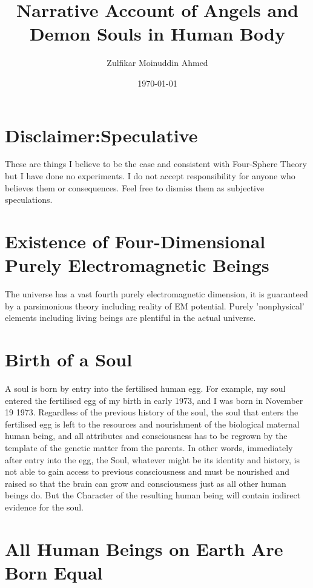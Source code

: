\documentclass{amsart}
\title{Narrative Account of Angels and Demon Souls in Human Body}
\author{Zulfikar Moinuddin Ahmed}
\date{\today}
\begin{document}
\maketitle

\section{Disclaimer:Speculative}

These are things I believe to be the case and consistent with Four-Sphere Theory but I have done no experiments.  I do not accept responsibility for anyone who believes them or consequences.  Feel free to dismiss them as subjective speculations.

\section{Existence of Four-Dimensional Purely Electromagnetic Beings}

The universe has a vast fourth purely electromagnetic dimension, it is guaranteed by a parsimonious theory including reality of EM potential.  Purely 'nonphysical' elements including living beings are plentiful in the actual universe.  

\section{Birth of  a Soul}

A soul is born by entry into the fertilised human egg.  For example, my soul entered the fertilised egg of my birth in early 1973, and I was born in November 19 1973.  Regardless of the previous history of the soul, the soul that enters the fertilised egg is left to the resources and nourishment of the biological maternal human being, and all attributes and consciousness has to be regrown by the template of the genetic matter from the parents.  In other words, immediately after entry into the egg, the Soul, whatever might be its identity and history, is not able to gain access to previous consciousness and must be nourished and raised so that the brain can grow and consciousness just as all other human beings do. But the Character of the resulting human being will contain indirect evidence for the soul.

\section{All Human Beings on Earth Are Born Equal}
\end{document}
